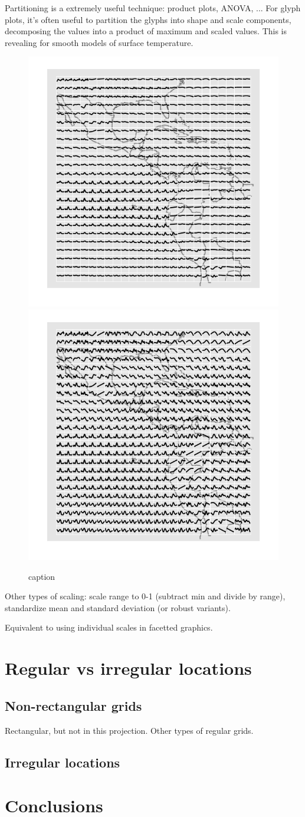 \documentclass[oneside]{article}
\begin{document}
Partitioning is a extremely useful technique: product plots, ANOVA, ...  For glyph plots, it's often useful to partition the glyphs into shape and scale components, decomposing the values into a product of maximum and scaled values. This is revealing for smooth models of surface temperature.

\begin{figure}[htbp]
  \centering
  \includegraphics[width=0.5\linewidth]{month-rescale-max}%
  \includegraphics[width=0.5\linewidth]{month-rescale01}
  \caption{caption}
  \label{fig:label}
\end{figure}

Other types of scaling: scale range to 0-1 (subtract min and divide by range), standardize mean and standard deviation (or robust variants). 

Equivalent to using individual scales in facetted graphics.


\section{Regular vs irregular locations}

\subsection{Non-rectangular grids}

Rectangular, but not in this projection.  Other types of regular grids.

\subsection{Irregular locations}

\section{Conclusions}


\end{document}
